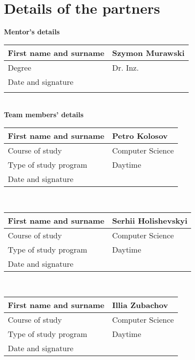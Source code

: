 \chapter*{\centering Details of the partners}\label{ch:partner-details}
\textbf{Mentor's details}\\
\begin{tabular}{|p{}|p{}|}
    \hline
    First name and surname & Szymon Murawski \\
    \hline
    Degree                 & Dr. Inz.        \\
    \hline
    Date and signature     &                 \\
    \hline
    \multicolumn{2}{c}{\vspace{0.5cm}} \\
\end{tabular}
\\[5mm]
\textbf{Team members' details} \\
\begin{tabular}{|p{}|p{}|}
    \hline
    First name and surname & Petro Kolosov    \\
    \hline
    Course of study        & Computer Science \\
    \hline
    Type of study program  & Daytime          \\
    \hline
    Date and signature     &                  \\
    \hline

\end{tabular}
\\[5mm]
\begin{tabular}{|p{}|p{}|}
    \hline
    First name and surname & Serhii Holishevskyi \\
    \hline
    Course of study        & Computer Science    \\
    \hline
    Type of study program  & Daytime             \\
    \hline
    Date and signature     &                     \\
    \hline

\end{tabular}
\\[5mm]
\begin{tabular}{|p{}|p{}|}
    \hline
    First name and surname & Illia Zubachov   \\
    \hline
    Course of study        & Computer Science \\
    \hline
    Type of study program  & Daytime          \\
    \hline
    Date and signature     &                  \\
    \hline
\end{tabular}
